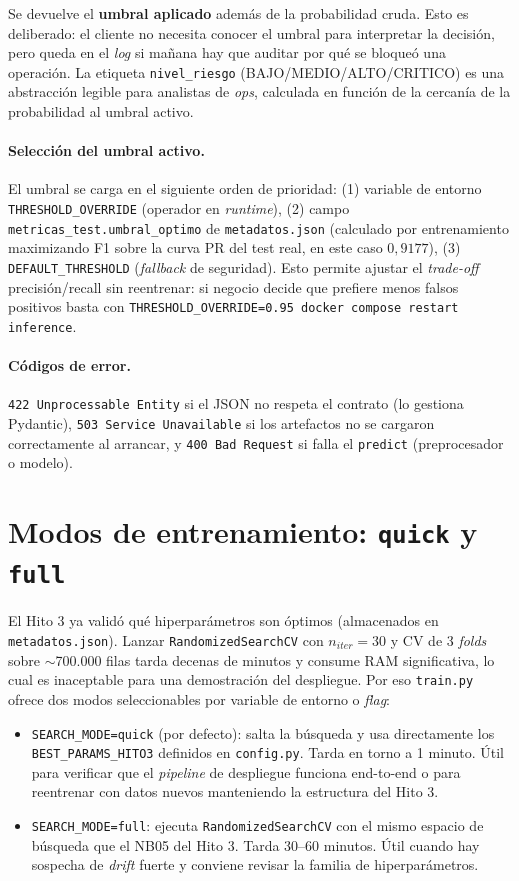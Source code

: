 \documentclass[12pt,a4paper]{report}
\begin{document}
Se devuelve el \textbf{umbral aplicado} además de la probabilidad cruda. Esto es deliberado: el cliente no necesita conocer el umbral para interpretar la decisión, pero queda en el \textit{log} si mañana hay que auditar por qué se bloqueó una operación. La etiqueta \texttt{nivel\_riesgo} (BAJO/MEDIO/ALTO/CRITICO) es una abstracción legible para analistas de \textit{ops}, calculada en función de la cercanía de la probabilidad al umbral activo.

\paragraph{Selección del umbral activo.} El umbral se carga en el siguiente orden de prioridad: (1) variable de entorno \texttt{THRESHOLD\_OVERRIDE} (operador en \textit{runtime}), (2) campo \texttt{metricas\_test.umbral\_optimo} de \texttt{metadatos.json} (calculado por entrenamiento maximizando F1 sobre la curva PR del test real, en este caso $0{,}9177$), (3) \texttt{DEFAULT\_THRESHOLD} (\textit{fallback} de seguridad). Esto permite ajustar el \textit{trade-off} precisión/recall sin reentrenar: si negocio decide que prefiere menos falsos positivos basta con \texttt{THRESHOLD\_OVERRIDE=0.95 docker compose restart inference}.

\paragraph{Códigos de error.} \texttt{422 Unprocessable Entity} si el JSON no respeta el contrato (lo gestiona Pydantic), \texttt{503 Service Unavailable} si los artefactos no se cargaron correctamente al arrancar, y \texttt{400 Bad Request} si falla el \texttt{predict} (preprocesador o modelo).

\section{Modos de entrenamiento: \texttt{quick} y \texttt{full}}
\label{sec:hito4-modos}

El Hito 3 ya validó qué hiperparámetros son óptimos (almacenados en \texttt{metadatos.json}). Lanzar \texttt{RandomizedSearchCV} con $n_{iter}=30$ y CV de 3 \textit{folds} sobre $\sim$700.000 filas tarda decenas de minutos y consume RAM significativa, lo cual es inaceptable para una demostración del despliegue. Por eso \texttt{train.py} ofrece dos modos seleccionables por variable de entorno o \textit{flag}:

\begin{itemize}
    \item \texttt{SEARCH\_MODE=quick} (por defecto): salta la búsqueda y usa directamente los \texttt{BEST\_PARAMS\_HITO3} definidos en \texttt{config.py}. Tarda en torno a 1 minuto. Útil para verificar que el \textit{pipeline} de despliegue funciona end-to-end o para reentrenar con datos nuevos manteniendo la estructura del Hito 3.
    \item \texttt{SEARCH\_MODE=full}: ejecuta \texttt{RandomizedSearchCV} con el mismo espacio de búsqueda que el NB05 del Hito 3. Tarda 30--60 minutos. Útil cuando hay sospecha de \textit{drift} fuerte y conviene revisar la familia de hiperparámetros.
\end{itemize}
\end{document}
